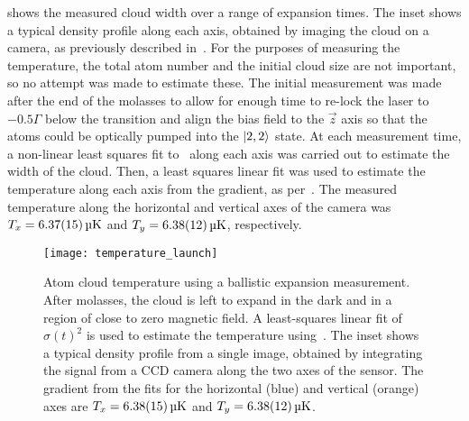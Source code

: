  shows the measured cloud width
over a range of expansion times. The inset shows a typical density
profile along each axis, obtained by imaging the cloud on a camera, as
previously described in~. For the purposes of
measuring the temperature, the total atom number and the initial cloud
size are not important, so no attempt was made to estimate these. The
initial measurement was made  after the end
of the molasses to allow for enough time to re-lock the laser to
\(-0.5\Gamma\) below the  transition and align the bias
field to the \(\vec{z}\) axis so that the atoms could be optically
pumped into the \(\ket{2,2}\) state. At each measurement time, a
non-linear least squares fit to~ along
each axis was carried out to estimate the width of the cloud. Then, a
least squares linear fit was used to estimate the temperature along
each axis from the gradient, as per~.
The measured temperature along the horizontal and vertical axes of the
camera was \(T_x = \sivalue{6.37 \pm 0.15}{\micro\kelvin}\) and \(T_y =
\sivalue{6.38 \pm 0.12}{\micro\kelvin}\), respectively.  

\begin{figure}[!htbp]
    \centering
    \texttt{[image: temperature\_launch]}
    \caption[Temperature measurement using ballistic expansion]{Atom
    cloud temperature using a ballistic expansion measurement. After
  molasses, the cloud is left to expand in the dark and in a region of
close to zero magnetic field. A least-squares linear fit of
\(\sigma(t)^2\) is used to estimate the temperature
using~. The inset shows a typical
density profile from a single image, obtained by integrating the
signal from a CCD camera along the two axes of the sensor. The
gradient from the fits for the horizontal (blue) and vertical (orange)
axes are  \(T_x = \sivalue{6.38 \pm0.15}{\micro\kelvin}\) and \(T_y =
\sivalue{6.38\pm0.12}{\micro\kelvin}\).}
    \label{fig:molasses_temperature}
\end{figure}

